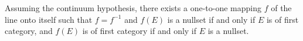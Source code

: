 Assuming the continuum hypothesis, there exists a one-to-one mapping $f$ of the line onto itself such that $f = f^{-1}$ and $f(E)$ is a nullset if and only if $E$ is of first category, and $f(E)$ is of first category if and only if $E$ is a nullset.
